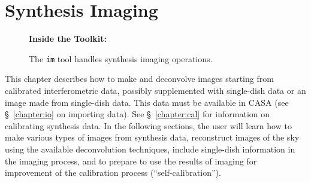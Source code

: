 


\chapter{Synthesis Imaging}
\label{chapter:im}

\begin{wrapfigure}{r}{2.5in}
  \begin{boxedminipage}{2.5in}
     \centerline{\bf Inside the Toolkit:}
     The {\tt im} tool handles synthesis imaging operations.
  \end{boxedminipage}
\end{wrapfigure}

This chapter describes how to make and deconvolve images starting from
calibrated interferometric data, possibly supplemented with
single-dish data or an image made from single-dish data.  This data
must be available in CASA (see \S~\ref{chapter:io} on importing data).
See \S~\ref{chapter:cal} for information on calibrating synthesis 
data.  In the following sections, the user will learn how to 
make various types of images from synthesis data, reconstruct images
of the sky using the available deconvolution techniques, include
single-dish information in the imaging process, and to prepare
to use the results of imaging for improvement of the calibration 
process (``self-calibration'').

